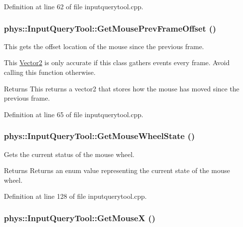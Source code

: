 Definition at line 62 of file inputquerytool.cpp.

\hypertarget{classphys_1_1InputQueryTool_aea2da0aeb97353f9d7af75f2a8cb7d91}{
\subsubsection[{GetMousePrevFrameOffset}]{ phys::InputQueryTool::GetMousePrevFrameOffset ()}}
\label{da/d96/classphys_1_1InputQueryTool_aea2da0aeb97353f9d7af75f2a8cb7d91}


This gets the offset location of the mouse since the previous frame. 

This \hyperlink{classphys_1_1Vector2}{Vector2} is only accurate if this class gathers events every frame. Avoid calling this function otherwise. \begin{DoxyReturn}{Returns}
This returns a vector2 that stores how the mouse has moved since the previous frame. 
\end{DoxyReturn}


Definition at line 65 of file inputquerytool.cpp.

\hypertarget{classphys_1_1InputQueryTool_a3b4c3475e48025fbffd18ae3b3acddec}{
\subsubsection[{GetMouseWheelState}]{ phys::InputQueryTool::GetMouseWheelState ()}}
\label{da/d96/classphys_1_1InputQueryTool_a3b4c3475e48025fbffd18ae3b3acddec}


Gets the current status of the mouse wheel. 

\begin{DoxyReturn}{Returns}
Returns an enum value representing the current state of the mouse wheel. 
\end{DoxyReturn}


Definition at line 128 of file inputquerytool.cpp.

\hypertarget{classphys_1_1InputQueryTool_a706c05a974dff509c61440f63bbe9d2d}{
\subsubsection[{GetMouseX}]{ phys::InputQueryTool::GetMouseX ()}}
\label{da/d96/classphys_1_1InputQueryTool_a706c05a974dff509c61440f63bbe9d2d}


